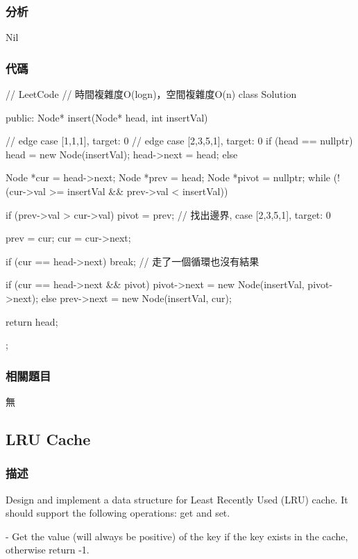 \subsubsection{分析}
Nil

\subsubsection{代碼}
\begin{Code}
// LeetCode
// 時間複雜度O(logn)，空間複雜度O(n)
class Solution {
public:
    Node* insert(Node* head, int insertVal) {
        // edge case [1,1,1], target: 0
        // edge case [2,3,5,1], target: 0
        if (head == nullptr) {
            head = new Node(insertVal);
            head->next = head;
        }
        else {
            Node *cur = head->next;
            Node *prev = head;
            Node *pivot = nullptr;
            while (!(cur->val >= insertVal && prev->val < insertVal)) {
                if (prev->val > cur->val)
                    pivot = prev; // 找出邊界, case [2,3,5,1], target: 0

                prev = cur;
                cur = cur->next;

                if (cur == head->next) break; // 走了一個循環也沒有結果
            }
            if (cur == head->next && pivot)
                pivot->next = new Node(insertVal, pivot->next);
            else
                prev->next = new Node(insertVal, cur);
        }
        return head;
    }
};
\end{Code}


\subsubsection{相關題目}
\begindot
\item 無
\myenddot


\subsection{LRU Cache}
\label{sec:lru-cache}


\subsubsection{描述}
Design and implement a data structure for Least Recently Used (LRU) cache. It should support the following operations: get and set.

 - Get the value (will always be positive) of the key if the key exists in the cache, otherwise return -1.

